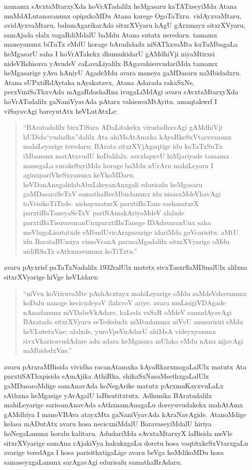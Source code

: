 namamx sAvxtaMtarxyXda hoVrATadalilx heMgasaru kaTATxseyiMda Atana muMdALutana\-vanunx opipxkoMDu Atana karege OgoTaTxru. vidAyxvaMtaru, avidAyxvaMtaru, bahunAgarikarAda sitxrXVyaru hAgU gArxmayx sitxrXVyaru, samAjada elalx vagaRdiMdalU baMdu Atana sutatx neredaru. tamamx maneyanunx biTuTx eMdU horage bAradidadx niSAThxvaMta kuTuMbagaLa heMgasarU saha I hoVrATakekx dhumukidarU gAMdhiVji niyaMtirxsi nideVRshisuva yAvudeV caLavaLiyalilx BAgavahisuvudariMda tamamx heMgasarige yAva hAniyU AgadeMdu avara maneya gaMDasaru naMbidadxru. Atana sUPxtiRdAytaka nAyakatavx, Atana Adarada rakaSxNe, perxVmiSaThxvAda mAgaRdashaRna ivugaLiMdAgi avaru sAvxtaMtarxyXda hoVrATadalilx gaNaniVyavAda pAtarx vahisuvaMtAyitu. amaqtakwrf I viSayavAgi bareyutAtx heVLutAtxLe:
\begin{quote}
``BAratadalilx birxTiSara ADaLitakekx virudadhxvAgi gAMdhiVji hUDida\break ``yudadhx''dalilx Ata ahiMsAtAmxka kAyaRkeSxVtarxvanunx mahiLeyarige tere\-daru; BArata sitxrXVjAgaqtige idu koTaTxSuTx iMbanunx matAtxvudU koDa\-lilalx. savxlapxvU hiMjariyade tamamx manegaLa surakeSxyiMda horage baMdu nUrAru mahiLeyaru I aginxpariVkeSxyanunx keYkoMDaru. keVDanAnxgali\break dabAbxLikeyanAnxgali edurisalu heMgasaru gaMDasaraSeTxV samathaR\-reMbu\-danunx idu nisasxMdeVhavAgi toVrisikoTiTxde. nishayxsatxrX parxtiBaTane sashasatxrX parxtiBaTaneyaSeTxV pariNAmakAriyoMdeV alalxde parxtiBaTisuvavaranUnx\break parxtiBaTanege IDAdavaranUnx saha meVlugoLisutatxde eMbudU\break vicArapararige idariMda goVcarisitu. aMtU idu BarataBUmiya vimoVcanA parxsaMgadalilx sitxrXVyarige oMdu nidiRSaTx sAthxnavanunx koTiTxtu.''
\end{quote}

avaru pAyxrisf paTaTxNadalilx {\rm 1932}ralUlx matetx sivxTasxrflaMDinalUlx alilxna sitxrXVyarige hiVge heVLidaru:
\begin{quote}
``niVvu koVriruvaMte pAshAcxtayx mahiLeyarige oMdu saMdeVshavanunx koDalu nanage kecicxdeyoV ilalxvoV ariye. avara muLisigiVDAgade nAnadanunx niVDabeVkAdare, kaLeda vaSaR oMdeV samudAyavAgi BAratada sitxrXVyaru seTededudx niMtudanunx niVvU anusarisiri eMdu heVLutetxVne; alalxde, yuroVpeVnAdarU ahiMsA videyxyanunx sivxVkarisuvudAdare adu adara heMgasara mUlaka eMdu nAnu nijavAgi naMbidedxVne.''
\end{quote}

avaru pArxraMBisida vividha racanAtamxka kAyaRkarxmagaLalUlx matutx Ata parxtiSAThxpisida sAmAjika AthiRka, shikaSxNasaMsethxgaLalUlx gaMDasaroMdige samAnavAda hoNegArike matutx pArxmuKayxvuLaLx sAthxna heMgasige yAvAgalU laBisutitxtutx. Adhunika BAratadalilx mahiLeyarige sarisamAnavAda sAthxnamAnagaLu doreyuvudakekx mahAtAmx gAMdhiya I manoVBAva atayxMta gaNaniVyavAda kAraNavAgide. AtanoMdige kelasa mADutAtx avaru hosa necicxniMdalU BaravaseyiMdalU hiriya hoNegaLanunx horalu kalitaru. AdudariMda sAvxtaMtarxyX laBisida meVle sitxrXVyarige samAna rAjakiVya hakukxgaLu doretu hosa vaqtitxkeSxVtarxgaLu avarige teredAga I hosa parisithxtigaLige avaru beVga hoMdikoMDu hosa samaseyxgaLanunx sarAgavAgi edurisalu samathaRrAdaru.

